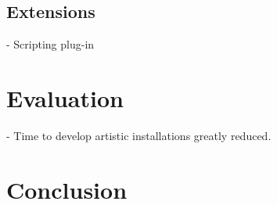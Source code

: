 \documentclass{sigchi}
\begin{document}

\subsection{Extensions}
- Scripting plug-in

\section{Evaluation}
- Time to develop artistic installations greatly reduced.

\section{Conclusion}



\end{document}
